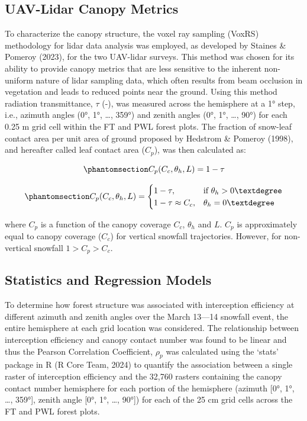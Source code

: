 \documentclass[
  letterpaper,
  DIV=11,
  numbers=noendperiod]{scrartcl}
\begin{document}
\subsection{UAV-Lidar Canopy Metrics}\label{uav-lidar-canopy-metrics}

To characterize the canopy structure, the voxel ray sampling (VoxRS)
methodology for lidar data analysis was employed, as developed by
Staines \& Pomeroy (2023), for the two UAV-lidar surveys. This method
was chosen for its ability to provide canopy metrics that are less
sensitive to the inherent non-uniform nature of lidar sampling data,
which often results from beam occlusion in vegetation and leads to
reduced points near the ground. Using this method radiation
transmittance, \(\tau\) (-), was measured across the hemisphere at a 1°
step, i.e., azimuth angles (0°, 1°, \ldots, 359°) and zenith angles (0°,
1°, \ldots, 90°) for each 0.25 m grid cell within the FT and PWL forest
plots. The fraction of snow-leaf contact area per unit area of ground
proposed by Hedstrom \& Pomeroy (1998), and hereafter called leaf
contact area (\(C_p\)), was then calculated as:

\begin{equation}\phantomsection\label{eq-lca}{
C_p(C_c, \theta_h, L) = 1-\tau
}\end{equation}

\begin{equation}\phantomsection\label{eq-tf-ode}{
C_p(C_c, \theta_h, L) = \begin{cases}
    1-\tau,& \text{if } \theta_h> 0°\\
    1-\tau \approx C_c ,              & \theta_h= 0°
\end{cases}
}\end{equation}

where \(C_p\) is a function of the canopy coverage \(C_c\), \(\theta_h\)
and \(L\). \(C_p\) is approximately equal to canopy coverage (\(C_c\))
for vertical snowfall trajectories. However, for non-vertical snowfall
\(1 > C_p > C_c\).

\subsection{Statistics and Regression
Models}\label{statistics-and-regression-models}

To determine how forest structure was associated with interception
efficiency at different azimuth and zenith angles over the March 13---14
snowfall event, the entire hemisphere at each grid location was
considered. The relationship between interception efficiency and canopy
contact number was found to be linear and thus the Pearson Correlation
Coefficient, \(\rho_p\) was calculated using the `stats' package in R (R
Core Team, 2024) to quantify the association between a single raster of
interception efficiency and the 32,760 rasters containing the canopy
contact number hemisphere for each portion of the hemisphere (azimuth
{[}0°, 1°, \ldots, 359°{]}, zenith angle {[}0°, 1°, \ldots, 90°{]}) for
each of the 25 cm grid cells across the FT and PWL forest plots.
\end{document}
